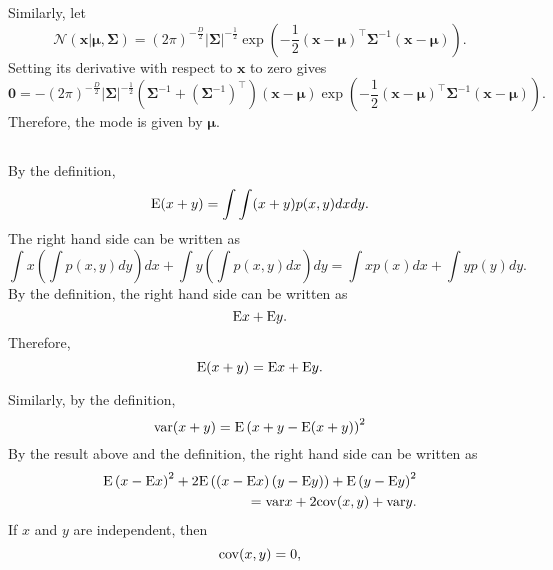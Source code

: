 Similarly, let
%
\begin{equation}
\mathcal{N} \left( \mathbf{x} | \bm{\mu}, \bm{\Sigma} \right) = \left( 2 \pi \right) ^ {- \frac{D}{2}} |\bm{\Sigma}| ^ {- \frac{1}{2}} \exp \left( - \frac{1}{2} (\mathbf{x} - \bm{\mu}) ^ \intercal \bm{\Sigma} ^ {- 1} (\mathbf{x} - \bm{\mu}) \right).
\end{equation}
%
Setting its derivative with respect to $\mathbf{x}$ to zero gives
%
\begin{equation}
\mathbf{0} = - \left( 2 \pi \right) ^ {- \frac{D}{2}} |\bm{\Sigma}| ^ {- \frac{1}{2}} \left( \bm{\Sigma} ^ {- 1} + \left( \bm{\Sigma} ^ {- 1} \right) ^ \intercal \right) (\mathbf{x} - \bm{\mu}) \exp \left( - \frac{1}{2} (\mathbf{x} - \bm{\mu}) ^ \intercal \bm{\Sigma} ^ {- 1} (\mathbf{x} - \bm{\mu}) \right).
\end{equation}
%
Therefore, the mode is given by $\bm{\mu}$.


\subsection{}
By the definition,
%
\begin{equation}
{\rm E} (x + y) = \int \int (x + y) p(x, y) dx dy.
\end{equation}
%
The right hand side can be written as 
%
\begin{equation}
\int x \left( \int p(x, y) dy \right) dx + \int y \left( \int p(x, y) dx \right) dy = \int x p(x) dx + \int y p(y) dy.
\end{equation}
%
By the definition, the right hand side can be written as 
%
\begin{equation}
{\rm E} x + {\rm E} y.
\end{equation}
%
Therefore, 
%
\begin{equation}
{\rm E} (x + y) = {\rm E} x + {\rm E} y.
\end{equation}
%

Similarly, by the definition,
%
\begin{equation}
{\rm var} (x + y) = {\rm E} \left( x + y - {\rm E} (x + y) \right) ^ 2
\end{equation}
%
By the result above and the definition, the right hand side can be written as 
%
\begin{equation}
\begin{aligned}
{\rm E} \left( x - {\rm E} x \right) ^ 2 + 2 {\rm E} \left( \left( x - {\rm E} x \right) \left( y - {\rm E} y \right) \right) + {\rm E} \left( y - {\rm E} y \right) ^ 2 \\
= {\rm var} x + 2 {\rm cov} (x, y) + {\rm var} y.
\end{aligned}
\end{equation}
%
If $x$ and $y$ are independent, then 
%
\begin{equation}
{\rm cov} (x, y) = 0,
\end{equation}

